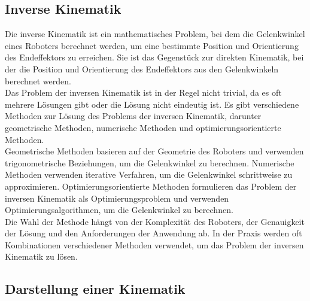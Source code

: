 \subsection{Inverse Kinematik}\label{subsec:InverseKinematik}
Die inverse Kinematik ist ein mathematisches Problem, bei dem die Gelenkwinkel eines Roboters berechnet werden, um eine bestimmte Position und Orientierung des Endeffektors zu erreichen. Sie ist das Gegenstück zur direkten Kinematik, bei der die Position und Orientierung des Endeffektors aus den Gelenkwinkeln berechnet werden.\\
Das Problem der inversen Kinematik ist in der Regel nicht trivial, da es oft mehrere Lösungen gibt oder die Lösung nicht eindeutig ist. Es gibt verschiedene Methoden zur Lösung des Problems der inversen Kinematik, darunter geometrische Methoden, numerische Methoden und optimierungsorientierte Methoden.\\
Geometrische Methoden basieren auf der Geometrie des Roboters und verwenden trigonometrische Beziehungen, um die Gelenkwinkel zu berechnen. Numerische Methoden verwenden iterative Verfahren, um die Gelenkwinkel schrittweise zu approximieren. Optimierungsorientierte Methoden formulieren das Problem der inversen Kinematik als Optimierungsproblem und verwenden Optimierungsalgorithmen, um die Gelenkwinkel zu berechnen.\\
Die Wahl der Methode hängt von der Komplexität des Roboters, der Genauigkeit der Lösung und den Anforderungen der Anwendung ab. In der Praxis werden oft Kombinationen verschiedener Methoden verwendet, um das Problem der inversen Kinematik zu lösen.\\

\subsection{Darstellung einer Kinematik}\label{subsec:DarstellungKinematik}

